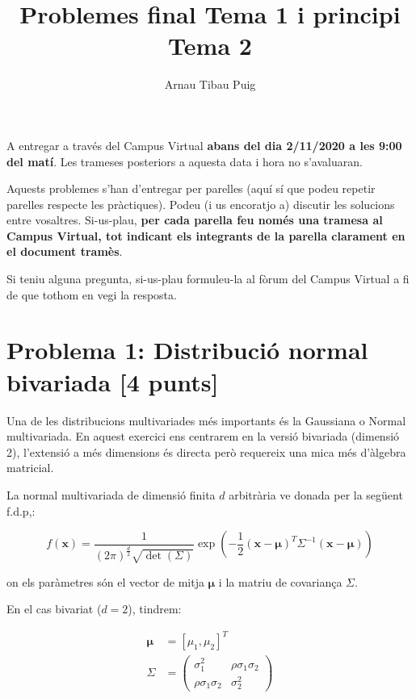 \documentclass[10pt,a4paper]{article}
\author{Arnau Tibau Puig}
\title{Problemes final Tema 1 i principi Tema 2}
\begin{document}
\maketitle

A entregar a través del Campus Virtual \textbf{abans del dia 2/11/2020 a les 9:00 del matí}. Les trameses posteriors a aquesta data i hora no s’avaluaran.

Aquests problemes s'han d'entregar per parelles (aquí sí que podeu repetir parelles respecte les pràctiques). Podeu (i us encoratjo a) discutir les solucions entre vosaltres. Si-us-plau, \textbf{per cada parella feu només una tramesa al Campus Virtual, tot indicant els integrants de la parella clarament en el document tramès}.

Si teniu alguna pregunta, si-us-plau formuleu-la al fòrum del Campus Virtual a fi de que tothom en vegi la resposta.

\section{Problema 1: Distribució normal bivariada [4 punts]} 

Una de les distribucions multivariades més importants és la Gaussiana o Normal
multivariada. En aquest exercici ens centrarem en la versió bivariada (dimensió 2),
l'extensió a més dimensions és directa però requereix una mica més d'àlgebra matricial.

La normal multivariada de dimensió finita $d$ arbitrària ve donada per la següent f.d.p,:

\begin{equation}
\label{mvn}
f(\mathbf{x})=\frac{1}{\left(2\pi\right)^{\frac{d}{2}} \sqrt{\det\left(\Sigma\right)}} \exp\left(-\frac{1}{2} \left(\mathbf{x} - \mathbf{\mu}\right)^T \Sigma^{-1}\left(\mathbf{x} - \mathbf{\mu} \right)\right)
\end{equation}

on els paràmetres són el vector de mitja $\mathbf{\mu}$ i la matriu de covariança $\Sigma$.

En el cas bivariat ($d=2$), tindrem:

\begin{eqnarray}
\label{bivariate}
\mathbf{\mu} &= [\mu_1, \mu_2]^T \nonumber \\
\Sigma &= \left( \begin{array}{cc} \sigma_1^2 & \rho  \sigma_1  \sigma_2 \\ \rho  \sigma_1  \sigma_2 & \sigma_2^2 \end{array}\right) 
\end{eqnarray} 
\end{document}
